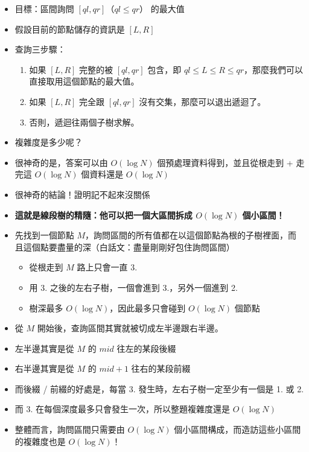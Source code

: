 \documentclass[standalone]{beamer}
\begin{document}
\begin{frame}{}
  \begin{itemize}
    \item 目標：區間詢問 \([ql,qr]\)（\(ql \leq qr\)） 的最大值
    \item 假設目前的節點儲存的資訊是 \([L, R]\)
    \item 查詢三步驟：
    \begin{enumerate}
      \item
        如果 \([L, R]\) 完整的被 \([ql, qr]\) 包含，即 \(ql \leq L \leq R \leq qr\)，那麼我們可以直接取用這個節點的最大值。
      \item
        如果 \([L, R]\) 完全跟 \([ql, qr]\) 沒有交集，那麼可以退出遞迴了。
      \item
        否則，遞迴往兩個子樹求解。
    \end{enumerate}
  \end{itemize}
\end{frame}

\begin{frame}{}
  \begin{itemize}
    \item 複雜度是多少呢？
    \item 很神奇的是，答案可以由 $O(\log N)$ 個預處理資料得到，並且從根走到 + 走完這 $O(\log N)$ 個資料還是 $O(\log N)$
    \item 很神奇的結論！證明記不起來沒關係
    \item \textbf{這就是線段樹的精隨：他可以把一個大區間拆成 $O(\log N)$ 個小區間！}
  \end{itemize}
\end{frame}

\begin{frame}{}
  \begin{itemize}
    \item 先找到一個節點 $M$，詢問區間的所有值都在以這個節點為根的子樹裡面，而且這個點要盡量的深（白話文：盡量剛剛好包住詢問區間）
    \begin{itemize}
      \item 從根走到 $M$ 路上只會一直 3.
      \item 用 3. 之後的左右子樹，一個會進到 3.，另外一個進到 2.
      \item 樹深最多 $O(\log N)$，因此最多只會碰到 $O(\log N)$ 個節點
    \end{itemize}
    \item 從 $M$ 開始後，查詢區間其實就被切成左半邊跟右半邊。
    \item 左半邊其實是從 $M$ 的 $mid$ 往左的某段後綴
    \item 右半邊其實是從 $M$ 的 $mid + 1$ 往右的某段前綴
    \item 而後綴 / 前綴的好處是，每當 3. 發生時，左右子樹一定至少有一個是 1. 或 2.
    \item 而 3. 在每個深度最多只會發生一次，所以整題複雜度還是 $O(\log N)$
    \item 整體而言，詢問區間只需要由 $O(\log N)$ 個小區間構成，而造訪這些小區間的複雜度也是 $O(\log N)$！
  \end{itemize}
\end{frame}
\end{document}
